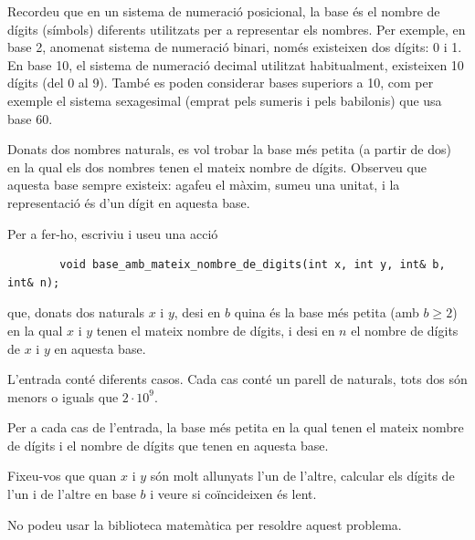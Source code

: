 

\Statement

Recordeu que en un sistema de numeració posicional, la base és el nombre de
dígits (símbols) diferents utilitzats per a representar els nombres. Per exemple, en
base 2, anomenat sistema de numeració binari, només existeixen dos dígits: 0 i
1. En base 10, el sistema de numeració decimal utilitzat habitualment,
existeixen 10 dígits (del 0 al 9). També es poden considerar bases superiors
a 10, com per exemple el sistema sexagesimal (emprat pels sumeris i pels
babilonis) que usa base 60.

\medskip

Donats dos nombres naturals, es vol trobar la base més petita (a partir de
dos) en la qual els dos nombres tenen el mateix nombre de dígits. Observeu que
aquesta base sempre existeix: agafeu el màxim, sumeu una unitat, i la
representació és d'un dígit en aquesta base.

\medskip

Per a fer-ho, escriviu i useu una acció

\begin{lstlisting}
        void base_amb_mateix_nombre_de_digits(int x, int y, int& b, int& n);
\end{lstlisting}

que, donats dos naturals $x$ i $y$,
desi en $b$ quina és la base més petita (amb $b\ge2$) en la qual $x$ i $y$ tenen el
mateix nombre de dígits, i desi en $n$ el nombre de dígits
de $x$ i $y$ en aquesta base.

\Input

L'entrada conté diferents casos.
Cada cas conté un parell de naturals, tots dos són menors o iguals que $2\cdot10^9$.

\Output

Per a cada cas de l'entrada, la base més petita en la qual tenen
el mateix nombre de dígits i el nombre de dígits que tenen en aquesta base.

\Hint

Fixeu-vos que quan $x$ i $y$ són molt allunyats l'un de l'altre, calcular
els dígits de l'un i de l'altre en base $b$ i veure si coïncideixen és lent.

\Observation

No podeu usar la biblioteca matemàtica per resoldre aquest problema.

\Sample
